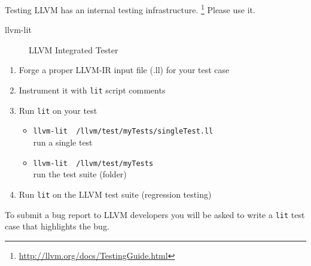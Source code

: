 \documentclass[10pt,mathserif]{beamer}
\begin{document}
\begin{frame}{Testing}
LLVM has an internal testing infrastructure. \footnote{\url{http://llvm.org/docs/TestingGuide.html}}
Please use it.
\\
\begin{description}
	\item[llvm-lit] LLVM Integrated Tester
\end{description}
\begin{enumerate}
	\item Forge a proper LLVM-IR input file (.ll) for your test case
	\item Instrument it with \texttt{lit} script comments
	\item Run \texttt{lit} on your test
		\begin{itemize}
			\item \texttt{llvm-lit ~/llvm/test/myTests/singleTest.ll}\\ run a single test
			\item \texttt{llvm-lit ~/llvm/test/myTests}\\ run the test suite (folder)
		\end{itemize}
	\item Run \texttt{lit} on the LLVM test suite (regression testing)
\end{enumerate}
\vfill
To submit a bug report to LLVM developers you will be asked to write a \texttt{lit} test case that highlights the bug.
\end{frame}
\end{document}
